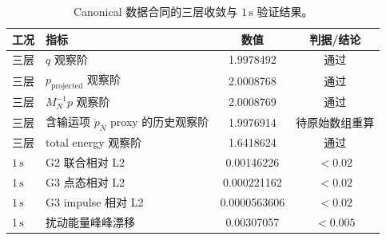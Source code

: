 \begin{table}[htbp]
\centering
\caption{Canonical 数据合同的三层收敛与 \(1\,\mathrm{s}\) 验证结果。}
\label{tab:canonical-time-step}
\scriptsize
\begin{tabularx}{\textwidth}{@{}l>{\raggedright\arraybackslash}Xcc@{}}
\toprule
工况 & 指标 & 数值 & 判据/结论 \\
\midrule
三层 & \(q\) 观察阶 & 1.9978492 & 通过 \\
三层 & \(p_{\mathrm{projected}}\) 观察阶 & 2.0008768 & 通过 \\
三层 & \(M_N^{-1}p\) 观察阶 & 2.0008769 & 通过 \\
三层 & 含输运项 \(\dot p_N\) proxy 的历史观察阶 & 1.9976914 & 待原始数组重算 \\
三层 & total energy 观察阶 & 1.6418624 & 通过 \\
\midrule
\(1\,\mathrm{s}\) & G2 联合相对 L2 & 0.00146226 & \(<0.02\) \\
\(1\,\mathrm{s}\) & G3 点态相对 L2 & 0.000221162 & \(<0.02\) \\
\(1\,\mathrm{s}\) & G3 impulse 相对 L2 & 0.0000563606 & \(<0.02\) \\
\(1\,\mathrm{s}\) & 扰动能量峰峰漂移 & 0.00307057 & \(<0.005\) \\
\bottomrule
\end{tabularx}
\end{table}

